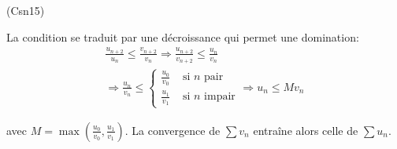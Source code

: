 \begin{tiny}(Csn15)\end{tiny} La condition se traduit par une décroissance qui permet une domination:
\begin{multline*}
\frac{u_{n+2}}{u_n}\leq \frac{v_{n+2}}{v_n} 
\Rightarrow \frac{u_{n+2}}{v_{n+2}}\leq \frac{u_n}{v_n} \\
\Rightarrow
\frac{u_n}{v_n} \leq 
\left\lbrace 
\begin{aligned}
  \frac{u_0}{v_0} &\text{ si $n$ pair} \\
  \frac{u_1}{v_1} &\text{ si $n$ impair}
\end{aligned}
\right. 
\Rightarrow u_n \leq M v_n
\end{multline*}

avec $M=\max(\frac{u_0}{v_0},\frac{u_1}{v_1})$. La convergence de $\sum v_n$ entraîne alors celle de $\sum u_n$.
